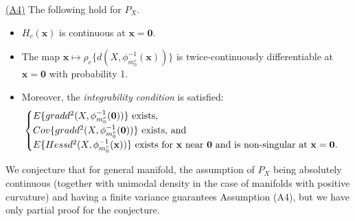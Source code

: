 \documentclass[preprint]{imsart}
\theoremstyle{plain}
\theoremstyle{remark}
\begin{document}
\begin{appendix}
\underline{(A4)} The following hold for $P_X$.
 \begin{itemize}
     \item[(i)] $H_{c}(\mathbf{x})$ is continuous at $\mathbf{x}=\mathbf{0}$.
     \item[(ii)] The map $\mathbf{x} \mapsto \rho_{c}\{d(X, \phi^{-1}_{m^{c}_{0}}(\mathbf{x}))\}$
 is twice-continuously differentiable at $\mathbf{x}=\mathbf{0}$ with probability 1.
     \item[(iii)] Moreover, the 
 \textit{integrability condition} is satisfied: 
\begin{equation}\label{integrability1}
    \begin{cases} E\{\textsf{grad}d^2(X, \phi_{m_{0}^{c}}^{-1}(\mathbf{0}))\} ~ \mbox{exists},  \\
 \textsf{Cov}\{\textsf{grad}d^2(X, \phi_{m_{0}^{c}}^{-1}(\mathbf{0}))\} ~ \mbox{exists, and} \\
 E\{\textsf{Hess}d^2(X, \phi_{m_{0}^{c}}^{-1}(\mathbf{x}))\} ~ \mbox{exists for $\mathbf{x}$ near $\mathbf{0}$ \mbox{and is non-singular at} $\mathbf{x}=\mathbf{0}$}.
  \end{cases}
\end{equation}
 \end{itemize}

 We conjecture that for general manifold, the assumption of $P_X$ being absolutely continuous (together with unimodal density in the case of manifolds with positive curvature) and having a finite variance guarantees Assumption (A4), but we have only partial proof for the conjecture.


\end{appendix}
\end{document}
